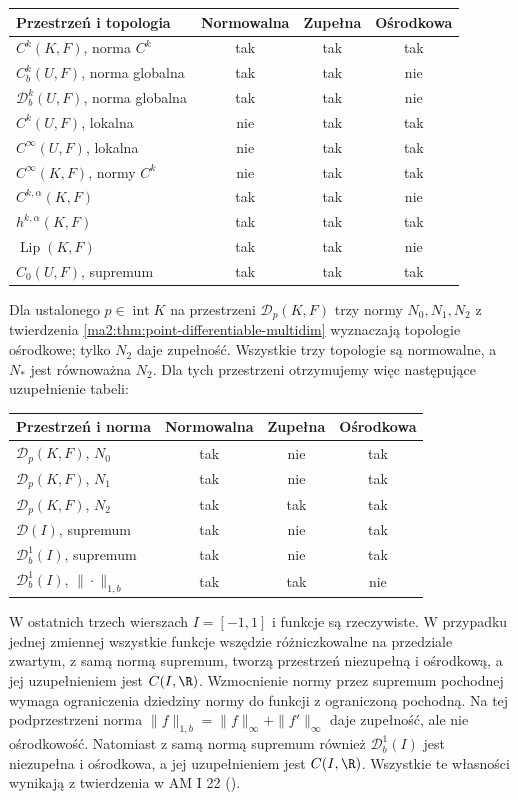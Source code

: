 \begin{center}
\small
\begin{tabular}{lccc}
Przestrzeń i topologia & Normowalna & Zupełna & Ośrodkowa\\ \hline
$C^k(K,F)$, norma $C^k$ & tak & tak & tak\\
$C_b^k(U,F)$, norma globalna & tak & tak & nie\\
$\mathcal D_b^k(U,F)$, norma globalna & tak & tak & nie\\
$C^k(U,F)$, lokalna & nie & tak & tak\\
$C^\infty(U,F)$, lokalna & nie & tak & tak\\
$C^\infty(K,F)$, normy $C^k$ & nie & tak & tak\\
$C^{k,\alpha}(K,F)$ & tak & tak & nie\\
$h^{k,\alpha}(K,F)$ & tak & tak & tak\\
$\operatorname{Lip}(K,F)$ & tak & tak & nie\\
$C_0(U,F)$, supremum & tak & tak & tak
\end{tabular}
\end{center}

Dla ustalonego $p\in\operatorname{int}K$ na przestrzeni $\mathcal D_p(K,F)$ trzy normy
$N_0,N_1,N_2$ z twierdzenia
\ref{ma2:thm:point-differentiable-multidim}
wyznaczają topologie ośrodkowe;
tylko $N_2$ daje zupełność.
Wszystkie trzy topologie są normowalne,
a $N_*$ jest równoważna $N_2$.
Dla tych przestrzeni otrzymujemy więc
następujące uzupełnienie tabeli:
\begin{center}
\small
\begin{tabular}{lccc}
Przestrzeń i norma & Normowalna & Zupełna & Ośrodkowa\\ \hline
$\mathcal D_p(K,F)$, $N_0$ & tak & nie & tak\\
$\mathcal D_p(K,F)$, $N_1$ & tak & nie & tak\\
$\mathcal D_p(K,F)$, $N_2$ & tak & tak & tak\\
$\mathcal D(I)$, supremum & tak & nie & tak\\
$\mathcal D_b^1(I)$, supremum & tak & nie & tak\\
$\mathcal D_b^1(I)$, $\|\cdot\|_{1,b}$ & tak & tak & nie
\end{tabular}
\end{center}
W ostatnich trzech wierszach $I=[-1,1]$
i funkcje są rzeczywiste.
W przypadku jednej zmiennej wszystkie
funkcje wszędzie różniczkowalne na
przedziale zwartym, z samą normą supremum,
tworzą przestrzeń niezupełną i ośrodkową,
a jej uzupełnieniem jest $C(I,\R)$.
Wzmocnienie normy przez supremum pochodnej
wymaga ograniczenia dziedziny normy
do funkcji z ograniczoną pochodną.
Na tej podprzestrzeni norma
$\|f\|_{1,b}=\|f\|_\infty+\|f'\|_\infty$
daje zupełność, ale nie ośrodkowość.
Natomiast z samą normą supremum również
$\mathcal D_b^1(I)$ jest niezupełna i ośrodkowa,
a jej uzupełnieniem jest $C(I,\R)$.
Wszystkie te własności wynikają z twierdzenia
w AM I 22 ().

